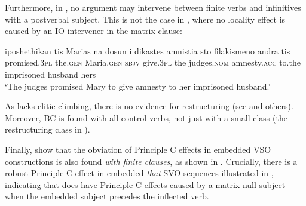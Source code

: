 \documentclass[output=paper]{langsci/langscibook}
\begin{document}
\ea%
    \label{ex:alexiadou:22}
    \z
\z   


Furthermore, in , no argument may intervene between finite verbs and infinitives with a postverbal subject. This is not the case in , where no locality effect is caused by an IO intervener in the matrix clause:

\begin{exe}%
\end{exe}

  

\ea%
    \label{ex:alexiadou:24}
    \gll iposhethikan     tis Marias  na  dosun       i dikastes     amnistia   sto filakismeno      andra     tis\\
         promised.\textsc{3pl}    the.\textsc{gen} Maria.\textsc{gen} \textsc{sbjv} give.\textsc{3pl} the judges.\textsc{nom}   amnesty.\textsc{acc} to.the imprisoned husband hers\\
    \glt   ‘The judges promised Mary to give amnesty to her imprisoned husband.’
    \z

As  lacks clitic climbing, there is no evidence for restructuring (see \citealt{Terzi1992} and others). Moreover, BC is found with all control verbs, not just with a small class (the restructuring class in ).

Finally, \citet{Tsakali2017} show that the obviation of Principle C effects in embedded VSO constructions is also found \emph{with finite clauses}, as shown in . Crucially, there is a robust Principle C effect in embedded \textit{that}{}-SVO sequences illustrated in , indicating that  does have Principle C effects caused by a matrix null subject when the embedded subject precedes the inflected verb.
\end{document}
